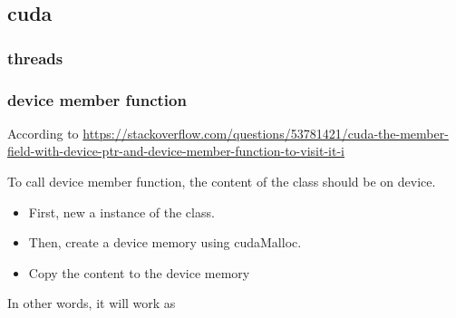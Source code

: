 \subsection{\label{cuda}cuda}

\subsubsection{\label{threads}threads}

\subsubsection{\label{device member function}device member function}

According to \href{https://stackoverflow.com/questions/53781421/cuda-the-member-field-with-device-ptr-and-device-member-function-to-visit-it-i}{https://stackoverflow.com/questions/53781421/cuda-the-member-field-with-device-ptr-and-device-member-function-to-visit-it-i}

To call device member function, the content of the class should be on device.

\begin{itemize}
  \item First, new a instance of the class.
  \item Then, create a device memory using cudaMalloc.
  \item Copy the content to the device memory
\end{itemize}

In other words, it will work as

